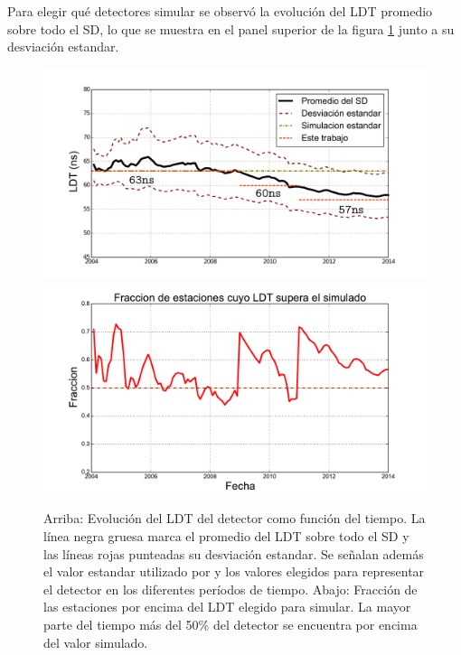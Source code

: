	Para elegir qué detectores simular se observó la evolución del LDT promedio sobre todo el SD, lo que se muestra en el panel superior de la figura \ref{fig:timeEvolution} junto a su desviación estandar.
	\begin{figure}[ht!]
		\begin{center}
			\includegraphics[width=\textwidth]{fig/resultadosAuger/timeEvolution}
			\\ \vspace{0mm}
			\includegraphics[width=\textwidth]{fig/resultadosAuger/fractionEvolution}
			\caption{Arriba: Evolución del LDT del detector como función del tiempo. La línea negra gruesa marca el promedio del LDT sobre todo el SD y las líneas rojas punteadas su desviación estandar.
			Se señalan además el valor estandar utilizado por \Offline{} y los valores elegidos para representar el detector en los diferentes períodos de tiempo.
			Abajo: Fracción de las estaciones por encima del LDT elegido para simular. La mayor parte del tiempo más del 50$\%$ del detector se encuentra por encima del valor simulado.}
			\label{fig:timeEvolution}
		\end{center}
	\end{figure}
